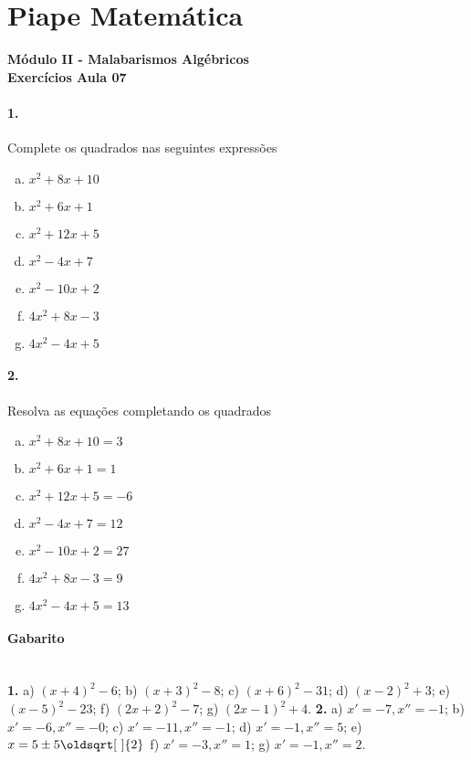 \documentclass[a4paper,12pt]{article}
\renewcommand*{\sqrt}[2][\ ]{\oldsqrt[#1]{#2}}
\begin{document}
 
  
\section*{Piape Matemática} 
\textbf{Módulo II - Malabarismos Algébricos}\\
\textbf{Exercícios Aula 07}         
\begin{multicols}{2}
\paragraph*{1.} Complete os quadrados nas seguintes expressões
\begin{enumerate}[a)]
\item $x^2 + 8x + 10$ 
\item $x^2 + 6x + 1$
\item $x^2 + 12x + 5$
\item $x^2 - 4x + 7$
\item $x^2 - 10x + 2$
\item $4x^2 + 8x - 3$
\item $4x^2 - 4x + 5$
\end{enumerate}

\paragraph*{2.} Resolva as equações completando os quadrados
\begin{enumerate}[a)]
\item $x^2 + 8x + 10 = 3$
\item $x^2 + 6x + 1 = 1$
\item $x^2 + 12x + 5 = -6$
\item $x^2 - 4x + 7 = 12$ %
\item $x^2 - 10x + 2 = 27$ %
\item $4x^2 + 8x - 3 = 9$ %
\item $4x^2 - 4x + 5 = 13$ %
\end{enumerate}
\vspace*{0cm}
\end{multicols}
 
\vspace*{\fill}
{\footnotesize\color{darkgray}
\paragraph*{Gabarito} \hspace*{\fill}\\
\textbf{1.} a) $(x+4)^2 - 6$; b) $(x+3)^2 - 8$; c) $(x+6)^2 - 31$; d) $(x-2)^2 + 3$; e) $(x-5)^2 - 23$; f) $(2x+2)^2 - 7$; g) $(2x-1)^2 + 4$.
\textbf{2.} a) $x' = -7, x''=-1$; b) $x' = -6, x''=-0$; c) $x' = -11, x''=-1$; d) $x' = -1, x''=5$; e) $x = 5 \pm 5\sqrt{2}$ f) $x' = -3, x''=1$; g) $x' = -1, x''=2$.
}
\end{document}
